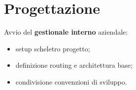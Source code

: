 \chapter{Progettazione}
Avvio del \textbf{gestionale interno} aziendale:
\begin{itemize}
  \item setup scheletro progetto;
  \item definizione routing e architettura base;
  \item condivisione convenzioni di sviluppo.
\end{itemize}